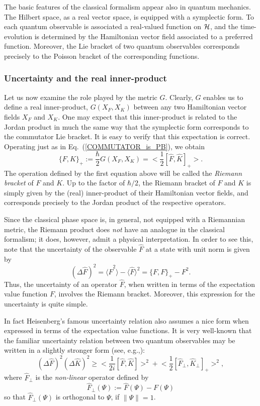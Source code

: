 \documentclass[12pt,aps,eqsecnum,tighten]{revtex4-2}
\def\be{\begin{equation}}
\def\ee{\end{equation}}
\def\<{\langle}
\def\>{\rangle}
\def\D{\Delta}
\def\i{{i}}
\def\H{{\cal H}}
\newcommand{\eqn}[1]{Eq.~(\ref{#1})}
\newcommand{\hvf}[1]{{X_{#1}}}
\begin{document}
The basic features of the classical formalism appear also in quantum
mechanics.  The Hilbert space, as a real vector space, is equipped
with a symplectic form.  To each quantum observable is associated a
real-valued function on $\H$, and the time-evolution is determined by
the Hamiltonian vector field associated to a preferred function.
Moreover, the Lie bracket of two quantum observables corresponds
precisely to the Poisson bracket of the corresponding functions.


\subsubsection{Uncertainty and the real inner-product}

Let us now examine the role played by the metric $G$. Clearly, $G$
enables us to define a real inner-product, $G(X_F, X_K)$ between any
two Hamiltonian vector fields $X_F$ and $X_K$. One may expect that
this inner-product is related to the Jordan product in much the same
way that the symplectic form corresponds to the commutator Lie
bracket. It is easy to verify that this expectation is
correct. Operating just as in \eqn{COMMUTATOR_is_PB}, we obtain 
%
\be
\label{symmetric_bracket}
\{ F, K \}_+ := \frac{\hbar}{2} G(\hvf{F}, \hvf{K})
= \bigg< \frac{1}{2} [\hat{F}, \hat{K}]_+ \bigg>.
\ee
%
The operation defined by the first equation above will be called the
{\em Riemann bracket} of $F$ and $K$.  Up to the factor of
$\hbar / 2$, the Riemann bracket of $F$ and $K$ is simply given
by the (real) inner-product of their Hamiltonian vector fields, and
corresponds precisely to the Jordan product of the respective
operators.

Since the classical phase space is, in general, not equipped with a
Riemannian metric, the Riemann product does {\em not} have an analogue
in the classical formalism; it does, however, admit a physical
interpretation.  In order to see this, note that the uncertainty of
the observable $\hat{F}$ at a state with unit norm is given by
%
\be \label{uncertainty}
(\D \hat{F})^2 = \< \hat{F}^2 \> - \< \hat{F} \>^2
= \{ F, F \}_+ - F^2.
\ee
%
Thus, the uncertainty of an operator $\hat{F}$, when written in terms
of the expectation value function $F$, involves the Riemann bracket.
Moreover, this expression for the uncertainty is quite simple.

In fact Heisenberg's famous uncertainty relation also assumes a nice
form when expressed in terms of the expectation value functions. It is
very well-known that the familiar uncertainty relation between two
quantum observables may be written in a slightly stronger
form (see, e.g.,\cite{shankar}): 
%
\be \label{std_unc_reln}
(\D \hat{F})^2 (\D \hat{K})^2 \ge
\bigg< \frac{1}{2\i} [ \hat{F}, \hat{K} ] \bigg>^2
+ \bigg< \frac{1}{2} [ \hat{F}_{\perp}, 
\hat{K}_{\perp} ]_+ \bigg>^2,
\ee
%
where $\hat{F}_{\perp}$ is the {\em non-linear} operator defined
by
\[
 \hat{F}_{\perp}(\Psi) := \hat{F}(\Psi) - F(\Psi)
\]
so that $\hat{F}_{\perp}(\Psi)$ is orthogonal to $\Psi$,
if $\| \Psi \| = 1$.
\end{document}
